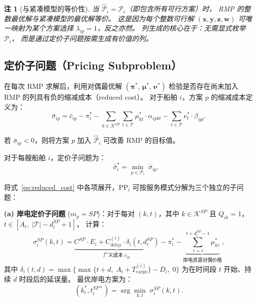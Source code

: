 \documentclass[UTF8, a4paper, 12pt]{ctexart}
\newtheorem{remark}{注}
\begin{document}
\begin{remark}[与紧凑模型的等价性]
当 $\hat{\mathcal{P}}_i = \mathcal{P}_i$（即包含所有可行方案）时，
RMP 的整数最优解与紧凑模型的最优解等价。
这是因为每个整数可行解
$(\mathbf{x}, \mathbf{y}, \mathbf{z}, \mathbf{w})$
可唯一映射为某个方案选择 $\lambda_{ip} = 1$，反之亦然。
列生成的核心在于：无需显式枚举 $\mathcal{P}_i$，
而是通过定价子问题按需生成有价值的列。
\end{remark}

\subsection{定价子问题（Pricing Subproblem）}
\label{sec:cg_pricing}

在每次 RMP 求解后，利用对偶最优解 $(\boldsymbol{\pi}^*,\, \boldsymbol{\mu}^*,\, \boldsymbol{\nu}^*)$
检验是否存在尚未加入 RMP 的列具有负的缩减成本（reduced cost）。
对于船舶 $i$，方案 $p$ 的缩减成本定义为：
\begin{equation}
  \bar{\sigma}_{ip}
  = \bar{c}_{ip}
  - \pi_i^*
  - \sum_{k \in \mathcal{K}^{SP}} \sum_{t \in \mathcal{T}}
    \mu_{kt}^* \cdot \alpha_{ipkt}
  - \sum_{t \in \mathcal{T}} \nu_t^* \cdot \beta_{ipt}.
  \label{eq:reduced_cost}
\end{equation}

\noindent
若 $\bar{\sigma}_{ip} < 0$，则将方案 $p$ 加入 $\hat{\mathcal{P}}_i$
可改善 RMP 的目标值。

对于每艘船舶 $i$，定价子问题为：
\begin{equation}
  [\text{PP}_i] \qquad
  \bar{\sigma}_i^* =
  \min_{p \in \mathcal{P}_i} \; \bar{\sigma}_{ip}.
  \label{eq:pricing}
\end{equation}

\noindent
将式~\eqref{eq:reduced_cost} 中各项展开，$\text{PP}_i$ 可按服务模式分解为三个独立的子问题：

\medskip
\noindent\textbf{(a) 岸电定价子问题}
($m_p = SP$)：对于每对 $(k, t)$，其中 $k \in \mathcal{K}^{SP}$
且 $Q_{ik} = 1$，$t \in [A_i,\; |\mathcal{T}| - d_i^{SP} + 1]$，
计算：
\begin{equation}
  \sigma_i^{SP}(k, t)
  = \underbrace{C^{SP} \cdot E_i + C_{\text{delay}}^{(i)} \cdot \delta_i(t, d_i^{SP})}_{
    \text{广义成本 } \bar{c}_{ip}}
  - \pi_i^*
  - \underbrace{\sum_{\tau = t}^{t + d_i^{SP} - 1} \mu_{k\tau}^*}_{
    \text{岸电资源对偶价格}},
  \label{eq:price_sp}
\end{equation}
其中 $\delta_i(t, d) = \max\!\big\{\max\{t + d,\; A_i + T_{\text{cargo}}^{(i)}\} - D_i,\; 0\big\}$
为在时间段 $t$ 开始、持续 $d$ 时段后的延误量。
最优岸电方案为：
\begin{equation}
  (k_i^*, t_i^{SP*}) = \arg\min_{k, t} \; \sigma_i^{SP}(k, t).
  \label{eq:price_sp_opt}
\end{equation}
\end{document}
